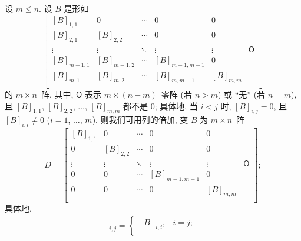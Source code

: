 \documentclass[../libro.tex]{subfiles}
\begin{document}
\begin{theorem}
    设 \(m \leq n\).
    设 \(B\) 是形如
    \begin{equation}
        \begin{bmatrix}
            [B]_{1,1}   & 0           & \cdots & 0             & 0         & {}         \\
            [B]_{2,1}   & [B]_{2,2}   & \cdots & 0             & 0         & {}         \\
            \vdots      & \vdots      & \ddots & \vdots        & \vdots    & \mathsf{O} \\
            [B]_{m-1,1} & [B]_{m-1,2} & \cdots & [B]_{m-1,m-1} & 0         & {}         \\
            [B]_{m,1}   & [B]_{m,2}   & \cdots & [B]_{m,m-1}   & [B]_{m,m} & {}         \\
        \end{bmatrix}
        \label{eq:lower-triangular-full-rank-V1}
    \end{equation}
    的 \(m \times n\)~阵,
    其中, \(\mathsf{O}\) 表示 \(m \times (n - m)\)~零阵
    (若 \(n > m\))
    或 ``无'' (若 \(n = m\)),
    且 \([B]_{1,1}\), \([B]_{2,2}\), \(\dots\), \([B]_{m,m}\)
    都不是 \(0\);
    具体地, 当 \(i < j\) 时, \([B]_{i,j} = 0\),
    且 \([B]_{i,i} \neq 0\) (\(i = 1\), \(\dots\), \(m\)).
    则我们可用列的倍加,
    变 \(B\) 为 \(m \times n\)~阵
    \begin{equation}
        D =
        \begin{bmatrix}
            [B]_{1,1} & 0         & \cdots & 0             & 0         & {}         \\
            0         & [B]_{2,2} & \cdots & 0             & 0         & {}         \\
            \vdots    & \vdots    & \ddots & \vdots        & \vdots    & \mathsf{O} \\
            0         & 0         & \cdots & [B]_{m-1,m-1} & 0         & {}         \\
            0         & 0         & \cdots & 0             & [B]_{m,m} & {}         \\
        \end{bmatrix};
        \label{eq:lower-triangular-full-rank-V2}
    \end{equation}
    具体地,
    \begin{align*}
        [D]_{i,j} =
        \begin{cases}
            [B]_{i,i}, & i = j;       \\

\end{cases}
\end{align*}
\end{theorem}
\end{document}
